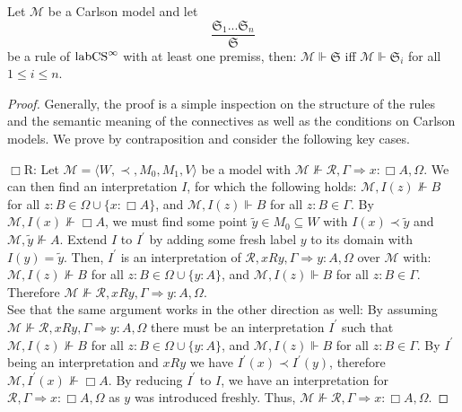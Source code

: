 \documentclass[runningheads,orivec]{llncs}
\newcommand{\labCS}{{\textnormal{labCS}^\infty}}
\newcommand{\Ra}{\Rightarrow}
\newcommand{\la}{\langle}
\newcommand{\ra}{\rangle}
\newcommand{\R}{\mathcal{R}}
\newcommand{\Mw}{\mathcal{M}}
\newcommand{\Seq}{\mathfrak{S}}
\begin{document}
\begin{lemma} \label{lem:FalsityCS}
    Let $\Mw$ be a Carlson model and let
    \[
    \frac{\Seq_1 ... \Seq_n}{\Seq}
    \]
    be a rule of $\labCS$ with at least one premiss, then: $\Mw \Vdash \Seq$ iff $\Mw \Vdash \Seq_i$ for all $1 \leq i \leq n$.
\end{lemma}
\begin{proof}
    Generally, the proof is a simple inspection on the structure of the rules and the semantic meaning of the connectives as well as the conditions on Carlson models. We prove by contraposition and consider the following key cases.

    $\Box$R: Let $\Mw = \la W , \prec , M_0 , M_1 , V \ra$ be a model with  ${\Mw \nVdash \R , \Gamma \Ra x : \Box A , \Omega}$. 
    We can then find an interpretation $I$, for which the following holds: $\Mw , I(z) \nVdash B$ for all $z : B \in \Omega \cup \{x : \Box A\}$, and $\Mw , I(z) \Vdash B$ for all $z : B \in \Gamma$. 
    By $\Mw , I(x) \nVdash \Box A$, we must find some point $\tilde{y} \in M_0 \subseteq W$ with $I(x) \prec \tilde{y}$ and $\Mw , \tilde{y} \nVdash A$. 
    Extend $I$ to $I^\prime$ by adding some fresh label $y$ to its domain with $I(y)=\tilde{y}$. Then, $I^\prime$ is an interpretation of $\R , xR y , \Gamma \Ra y : A , \Omega$ over $\Mw$ with: $\Mw , I(z) \nVdash B$ for all $z : B \in \Omega \cup \{y : A\}$, and $\Mw , I(z) \Vdash B$ for all $z : B \in \Gamma$. Therefore $\Mw \nVdash \R , xR y , \Gamma \Ra y : A , \Omega$.\\ 
    See that the same argument works in the other direction as well:
    By assuming $\Mw \nVdash \R , xR y , \Gamma \Ra y : A , \Omega$ there must be an interpretation $I^\prime$ such that $\Mw , I(z) \nVdash B$ for all $z : B \in \Omega \cup \{y : A\}$, and $\Mw , I(z) \Vdash B$ for all $z : B \in \Gamma$. By $I^\prime$ being an interpretation and $x R y$ we have $I^\prime (x) \prec I^\prime (y)$, therefore $\Mw , I^\prime (x) \nVdash \Box A$. By reducing $I^\prime$ to $I$, we have an interpretation for $\R , \Gamma \Ra x : \Box A , \Omega$ as $y$ was introduced freshly. Thus, $\Mw \nVdash \R , \Gamma \Ra x : \Box A , \Omega$.


\end{proof}
\end{document}
